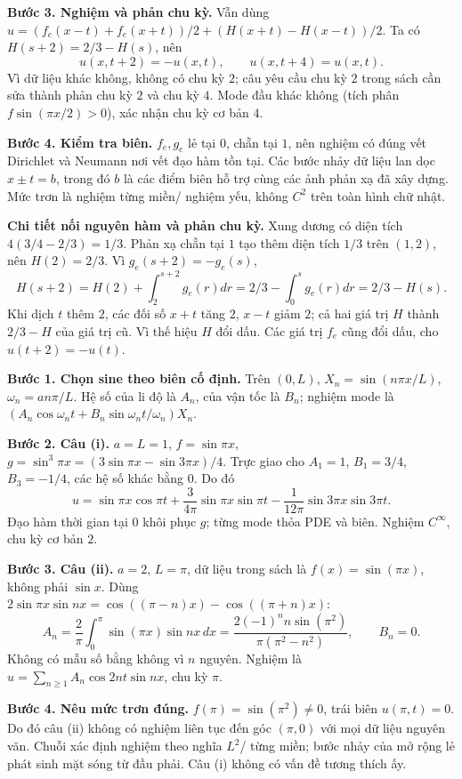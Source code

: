 \textbf{Bước 3. Nghiệm và phản chu kỳ.} Vẫn dùng $u=(f_e(x-t)+f_e(x+t))/2+(H(x+t)-H(x-t))/2$. Ta có $H(s+2)=2/3-H(s)$, nên
\[u(x,t+2)=-u(x,t),\qquad u(x,t+4)=u(x,t).\]
Vì dữ liệu khác không, không có chu kỳ $2$; câu yêu cầu chu kỳ $2$ trong sách cần sửa thành phản chu kỳ $2$ và chu kỳ $4$. Mode đầu khác không (tích phân $f\sin(\pi x/2)>0$), xác nhận chu kỳ cơ bản $4$.

\textbf{Bước 4. Kiểm tra biên.} $f_e,g_e$ lẻ tại $0$, chẵn tại $1$, nên nghiệm có đúng vết Dirichlet và Neumann nơi vết đạo hàm tồn tại. Các bước nhảy dữ liệu lan dọc $x\pm t=b$, trong đó $b$ là các điểm biên hỗ trợ cùng các ảnh phản xạ đã xây dựng. Mức trơn là nghiệm từng miền/ nghiệm yếu, không $C^2$ trên toàn hình chữ nhật.

\textbf{Chi tiết nối nguyên hàm và phản chu kỳ.} Xung dương có diện tích $4(3/4-2/3)=1/3$. Phản xạ chẵn tại $1$ tạo thêm diện tích $1/3$ trên $(1,2)$, nên $H(2)=2/3$. Vì $g_e(s+2)=-g_e(s)$,
\[H(s+2)=H(2)+\int_2^{s+2}g_e(r)dr=2/3-\int_0^sg_e(r)dr=2/3-H(s).\]
Khi dịch $t$ thêm $2$, các đối số $x+t$ tăng $2$, $x-t$ giảm $2$; cả hai giá trị $H$ thành $2/3-H$ của giá trị cũ. Vì thế hiệu $H$ đổi dấu. Các giá trị $f_e$ cũng đổi dấu, cho $u(t+2)=-u(t)$.

\textbf{Bước 1. Chọn sine theo biên cố định.} Trên $(0,L)$, $X_n=\sin(n\pi x/L)$, $\omega_n=an\pi/L$. Hệ số của li độ là $A_n$, của vận tốc là $B_n$; nghiệm mode là $(A_n\cos\omega_nt+B_n\sin\omega_nt/\omega_n)X_n$.

\textbf{Bước 2. Câu (i).} $a=L=1$, $f=\sin\pi x$, $g=\sin^3\pi x=(3\sin\pi x-\sin3\pi x)/4$. Trực giao cho $A_1=1$, $B_1=3/4$, $B_3=-1/4$, các hệ số khác bằng $0$. Do đó
\[u=\sin\pi x\cos\pi t+\frac3{4\pi}\sin\pi x\sin\pi t-\frac1{12\pi}\sin3\pi x\sin3\pi t.\]
Đạo hàm thời gian tại $0$ khôi phục $g$; từng mode thỏa PDE và biên. Nghiệm $C^\infty$, chu kỳ cơ bản $2$.

\textbf{Bước 3. Câu (ii).} $a=2$, $L=\pi$, dữ liệu trong sách là $f(x)=\sin(\pi x)$, không phải $\sin x$. Dùng $2\sin\pi x\sin nx=\cos((\pi-n)x)-\cos((\pi+n)x)$:
\[A_n=\frac2\pi\int_0^\pi\sin(\pi x)\sin nx\,dx
=\frac{2(-1)^nn\sin(\pi^2)}{\pi(\pi^2-n^2)},\qquad B_n=0.\]
Không có mẫu số bằng không vì $n$ nguyên. Nghiệm là $u=\sum_{n\ge1}A_n\cos2nt\sin nx$, chu kỳ $\pi$.

\textbf{Bước 4. Nêu mức trơn đúng.} $f(\pi)=\sin(\pi^2)\ne0$, trái biên $u(\pi,t)=0$. Do đó câu (ii) không có nghiệm liên tục đến góc $(\pi,0)$ với mọi dữ liệu nguyên văn. Chuỗi xác định nghiệm theo nghĩa $L^2$/ từng miền; bước nhảy của mở rộng lẻ phát sinh mặt sóng từ đầu phải. Câu (i) không có vấn đề tương thích ấy.

